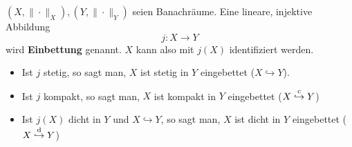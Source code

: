 \begin{definition}
	$\left(X,\|\cdot\|_{X}\right),\left(Y,\|\cdot\|_{Y}\right)$ seien Banachräume. Eine lineare, injektive Abbildung
	\begin{equation*}
		j\colon X\to Y
	\end{equation*}
	wird \textbf{Einbettung} genannt. $X$ kann also mit $j\left(X\right)$ identifiziert werden.
	\begin{itemize}
		\item Ist $j$ stetig, so sagt man, $X$ ist stetig in $Y$ eingebettet ($X\hookrightarrow Y$).
		\item Ist $j$ kompakt, so sagt man, $X$ ist kompakt in $Y$ eingebettet ($X\cembed Y$)
		\item Ist $j\left(X\right)$ dicht in $Y$ und $X\hookrightarrow Y$, so sagt man, $X$ ist dicht in $Y$ eingebettet ($X\dembed Y$)
	\end{itemize}
\end{definition}

